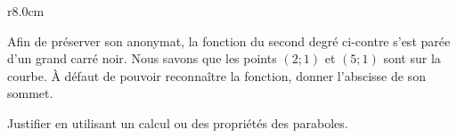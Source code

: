 
\begin{exercice}\label{exosmath-0146}

\begin{wrapfigure}{r}{8.0cm}
   \vspace{-0.5cm}        %
   \centering
   
\end{wrapfigure}
    Afin de préserver son anonymat, la fonction du second degré ci-contre s'est parée d'un grand carré noir. Nous savons que les points \( (2;1)\) et \( (5;1)\) sont sur la courbe. À défaut de pouvoir reconnaître la fonction, donner l'abscisse de son sommet.

    Justifier en utilisant un calcul ou des propriétés des paraboles.

\end{exercice}
